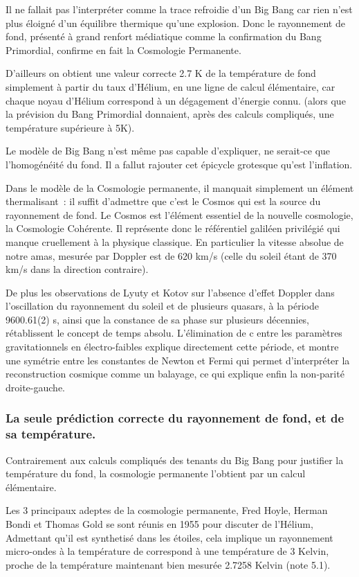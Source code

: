 \documentclass[a4paper,12pt]{article}
\begin{document}
Il ne fallait pas l’interpréter comme la trace refroidie d'un Big Bang car rien n'est plus éloigné d'un équilibre thermique qu'une explosion. Donc le rayonnement de fond, présenté à grand renfort médiatique comme la confirmation du Bang Primordial, confirme en fait la Cosmologie Permanente. 


D'ailleurs on obtient une valeur correcte 2.7 K de la température de fond simplement à partir du taux d'Hélium, en une ligne de calcul élémentaire, car chaque noyau d'Hélium correspond à un dégagement d'énergie connu. (alors que la prévision du Bang Primordial donnaient, après des calculs compliqués, une température supérieure à 5K).  


Le modèle de Big Bang n’est m\^eme pas capable d’expliquer, ne serait-ce que l'homogénéité du fond.  Il a fallut rajouter cet épicycle grotesque qu'est l'inflation. 


    Dans le modèle de la Cosmologie permanente, il manquait simplement un élément thermalisant : il suffit d'admettre que c'est le Cosmos qui est la source du rayonnement de fond. Le Cosmos est l'élément essentiel de la nouvelle cosmologie, la Cosmologie Cohérente. Il représente donc le référentiel galiléen privilégié qui manque cruellement à la physique classique. En particulier la vitesse absolue de notre amas, mesurée par Doppler est de 620 km/s (celle du soleil étant de 370 km/s dans la direction contraire).

 
   De plus les observations de Lyuty et Kotov sur l'absence d'effet Doppler dans l'oscillation du rayonnement du soleil et de plusieurs quasars, à la période 9600.61(2) s, ainsi que la constance de sa phase sur plusieurs décennies, rétablissent le concept de temps absolu. L'élimination de c entre les paramètres gravitationnels en électro-faibles explique directement cette période, et montre une symétrie entre les constantes de Newton et Fermi qui permet d'interpréter la reconstruction cosmique comme un balayage, ce qui explique enfin la non-parité droite-gauche.


\subsubsection{La seule prédiction correcte du rayonnement de fond, et de sa température.}

Contrairement aux calculs compliqués des tenants du Big Bang pour justifier la température du fond, la cosmologie permanente l'obtient par un calcul élémentaire.

   Les 3 principaux adeptes de la cosmologie permanente, Fred Hoyle, Herman Bondi et Thomas Gold se sont réunis en 1955 pour discuter de l'Hélium, Admettant qu'il est synthetisé dans les étoiles, cela implique un rayonnement micro-ondes à la température de correspond à une température de 3 Kelvin, proche de la température maintenant bien mesurée  2.7258   Kelvin (note 5.1).
\end{document}
